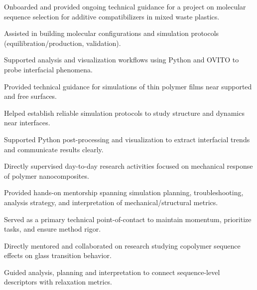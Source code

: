 \documentclass[letterpaper,11pt]{article}
\begin{document}
\begin{menteeitems}
  \item Onboarded and provided ongoing technical guidance for a project on molecular sequence selection for additive compatibilizers in mixed waste plastics.
  \item Assisted in building molecular configurations and simulation protocols (equilibration/production, validation).
  \item Supported analysis and visualization workflows using Python and OVITO to probe interfacial phenomena.
\end{menteeitems}

\begin{menteeitems}
  \item Provided technical guidance for simulations of thin polymer films near supported and free surfaces.
  \item Helped establish reliable simulation protocols to study structure and dynamics near interfaces.
  \item Supported Python post-processing and visualization to extract interfacial trends and communicate results clearly.
\end{menteeitems}

\begin{menteeitems}
  \item Directly supervised day-to-day research activities focused on mechanical response of polymer nanocomposites.
  \item Provided hands-on mentorship spanning simulation planning, troubleshooting, analysis strategy, and interpretation of mechanical/structural metrics.
  \item Served as a primary technical point-of-contact to maintain momentum, prioritize tasks, and ensure method rigor.
\end{menteeitems}

\begin{menteeitems}
  \item Directly mentored and collaborated on research studying copolymer sequence effects on glass transition behavior.
  \item Guided analysis, planning and interpretation to connect sequence-level descriptors with relaxation metrics.
\end{menteeitems}
\end{document}
